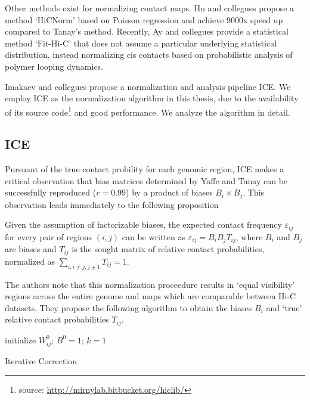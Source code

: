 Other methods exist for normalizing contact maps.  Hu and collegues propose a method `HiCNorm' based on Poisson regression and achieve
9000x speed up compared to Tanay's method\cite{hu2012}.  Recently, Ay and collegues provide a statistical method `Fit-Hi-C' that does
not assume a particular underlying statistical distribution, instead normalizing cis contacts based on probabilistic analysis of polymer looping
dynamics\cite{ay2014}.

Imakaev and collegues propose a normalization and analysis pipeline \gls{ICE}\cite{imakaev2012}.  We employ \gls{ICE} as the normalization
algorithm in this thesis, due to the availability of its source code\footnote{source: \url{http://mirnylab.bitbucket.org/hiclib/}} and good
performance.   We analyze the algorithm in detail.

\subsection*{\gls{ICE}}

Pursuant of the true contact probility for each genomic region, \gls{ICE} makes a critical observation that bias matrices determined by
Yaffe and Tanay\cite{yaffe2011} can be successfully reproduced ($r = 0.99$) by a product of biases $B_i \times B_j$.  This observation leads
immediately to the following proposition

\begin{prop}
  Given the assumption of factorizable biases, the expected contact frequency $\varepsilon_{ij}$ for every pair of regions $(i,j)$ can
  be written as $\varepsilon_{ij} = B_{i}B_{j}T_{ij}$, where $B_i$ and $B_j$ are biases and $T_{ij}$ is the sought matrix of relative contact
  probabilities, normalized as $\sum_{i, i \neq j, j \pm 1}T_{ij} = 1$.
\end{prop}

The authors note that this normalization proceedure results in `equal visibility' regions across the entire genome and maps which are
comparable between Hi-C datasets.  They propose the following algorithm to obtain the biases $B_i$ and `true' relative contact probabilities
$T_{ij}$.

\begin{algorithm}[H]
  initialize $W^{0}_{ij}$; $B^0 = 1$; $k = 1$\;
  \caption{Iterative Correction}
\end{algorithm}

